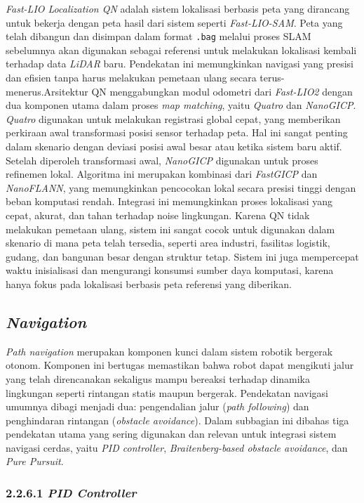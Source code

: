 \emph{Fast-LIO Localization QN} adalah sistem lokalisasi berbasis peta yang dirancang untuk bekerja dengan peta hasil dari sistem seperti \emph{Fast-LIO-SAM}. Peta yang telah dibangun dan disimpan dalam format \texttt{.bag} melalui proses SLAM sebelumnya akan digunakan sebagai referensi untuk melakukan lokalisasi kembali terhadap data \emph{LiDAR} baru. Pendekatan ini memungkinkan navigasi yang presisi dan efisien tanpa harus melakukan pemetaan ulang secara terus-menerus.Arsitektur QN menggabungkan modul odometri dari \emph{Fast-LIO2} dengan dua komponen utama dalam proses \emph{map matching}, yaitu \emph{Quatro} dan \emph{NanoGICP}. \emph{Quatro} digunakan untuk melakukan registrasi global cepat, yang memberikan perkiraan awal transformasi posisi sensor terhadap peta. Hal ini sangat penting dalam skenario dengan deviasi posisi awal besar atau ketika sistem baru aktif. Setelah diperoleh transformasi awal, \emph{NanoGICP} digunakan untuk proses refinemen lokal. Algoritma ini merupakan kombinasi dari \emph{FastGICP} dan \emph{NanoFLANN}, yang memungkinkan pencocokan lokal secara presisi tinggi dengan beban komputasi rendah. Integrasi ini memungkinkan proses lokalisasi yang cepat, akurat, dan tahan terhadap noise lingkungan. Karena QN tidak melakukan pemetaan ulang, sistem ini sangat cocok untuk digunakan dalam skenario di mana peta telah tersedia, seperti area industri, fasilitas logistik, gudang, dan bangunan besar dengan struktur tetap. Sistem ini juga mempercepat waktu inisialisasi dan mengurangi konsumsi sumber daya komputasi, karena hanya fokus pada lokalisasi berbasis peta referensi yang diberikan\cite{fastlio2023qnloc}.


\subsection{\emph{Navigation}}
\emph{Path navigation} merupakan komponen kunci dalam sistem robotik bergerak otonom. Komponen ini bertugas memastikan bahwa robot dapat mengikuti jalur yang telah direncanakan sekaligus mampu bereaksi terhadap dinamika lingkungan seperti rintangan statis maupun bergerak. Pendekatan navigasi umumnya dibagi menjadi dua: pengendalian jalur (\emph{path following}) dan penghindaran rintangan (\emph{obstacle avoidance}). Dalam subbagian ini dibahas tiga pendekatan utama yang sering digunakan dan relevan untuk integrasi sistem navigasi cerdas, yaitu \emph{PID controller}, \emph{Braitenberg-based obstacle avoidance}, dan \emph{Pure Pursuit}.

\subsubsection{2.2.6.1 \emph{PID Controller}}

